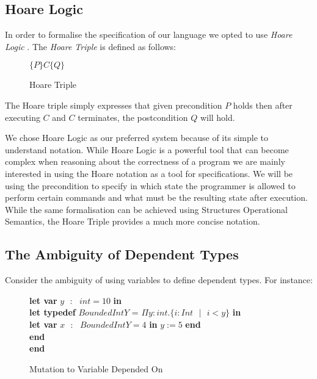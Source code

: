 \documentclass[a4paper,12pt]{report}
\newenvironment{tabs}[1]
 {\flushleft\TabPositions{#1}}
 {\endflushleft}
\begin{document}
\subsection{Hoare Logic}
In order to formalise the specification of our language we opted to use 
\textit{Hoare Logic} \cite{hoare}. The \textit{Hoare Triple} is defined as follows: 

\begin{figure}[H]
  \begin{center}
    $\{P\}C\{Q\}$
  \end{center}
  \caption{Hoare Triple}
\end{figure}
The Hoare triple simply expresses that given precondition $P$ holds then after executing $C$ 
and $C$ terminates, the postcondition $Q$ will hold.

\par
We chose Hoare Logic as our preferred system because of its simple to understand 
notation. While Hoare Logic is a powerful tool that can become complex when 
reasoning about the correctness of a program we are mainly interested in using 
the Hoare notation as a tool for specifications. We will be using the 
precondition to specify in which state the programmer is allowed to perform 
certain commands and what must be the resulting state after execution. While the 
same formalisation can be achieved using Structures Operational Semantics, the 
Hoare Triple provides a much more concise notation. 


\subsection{The Ambiguity of Dependent Types}
Consider the ambiguity of using variables to define dependent types. For 
instance: 

\begin{figure} [H]
  \begin{tabs}{1cm,2cm}
    \textbf{let var }$y\text{ }:\text{ } int = 10$ \textbf{ in } \\
    \tab\textbf{let typedef }$BoundedIntY$ = $\Pi y : int. \{i : Int\text{ }|\text{ }i < y\}$ \textbf{ in } \\ 
    \tab\tab\textbf{let var }$x\text{ }:\text{ }BoundedIntY = 4$ \textbf{ in }$y := 5$\textbf { end} \\
    \tab\textbf {end} \\
    \textbf{end}
  \end{tabs}  
  \caption{Mutation to Variable Depended On}
\end{figure}
\end{document}
